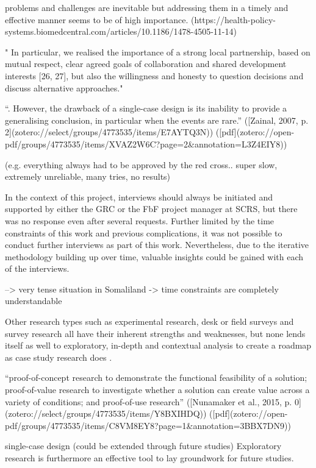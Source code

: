 problems and challenges are inevitable but addressing them in a timely and effective manner seems to be of high importance. (https://health-policy-systems.biomedcentral.com/articles/10.1186/1478-4505-11-14)


" In particular, we realised the importance of a strong local partnership, based on mutual respect, clear agreed goals of collaboration and shared development interests [26, 27], but also the willingness and honesty to question decisions and discuss alternative approaches."



“. However, the drawback of a single-case design is its inability to provide a generalising conclusion, in particular when the events are rare.” ([Zainal, 2007, p. 2](zotero://select/groups/4773535/items/E7AYTQ3N)) ([pdf](zotero://open-pdf/groups/4773535/items/XVAZ2W6C?page=2&annotation=L3Z4EIY8))

(e.g. everything always had to be approved by the red cross.. super slow, extremely unreliable, many tries, no results)

In the context of this project, interviews should always be initiated and supported by either the GRC or the FbF project manager at SCRS, but there was no response even after several requests. Further limited by the time constraints of this work and previous complications, it was not possible to conduct further interviews as part of this work. Nevertheless, due to the iterative methodology building up over time, valuable insights could be gained with each of the interviews. 

--> very tense situation in Somaliland -> time constraints are completely understandable

Other research types such as experimental research, desk or field surveys and survey research all have their inherent strengths and weaknesses, but none lends itself as well to exploratory, in-depth and contextual analysis to create a roadmap as case study research does \autocite{pelzResearchMethodsSocial}.

“proof-of-concept research to demonstrate the functional feasibility of a solution; proof-of-value research to investigate whether a solution can create value across a variety of conditions; and proof-of-use research” ([Nunamaker et al., 2015, p. 0](zotero://select/groups/4773535/items/Y8BXIHDQ)) ([pdf](zotero://open-pdf/groups/4773535/items/C8VM8EY8?page=1&annotation=3BBX7DN9))

single-case design (could be extended through future studies)
Exploratory research is furthermore an effective tool to lay groundwork for future studies.

